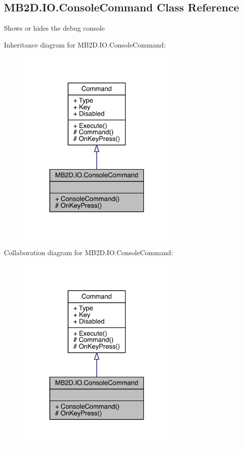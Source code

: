 \hypertarget{class_m_b2_d_1_1_i_o_1_1_console_command}{}\subsection{M\+B2\+D.\+I\+O.\+Console\+Command Class Reference}
\label{class_m_b2_d_1_1_i_o_1_1_console_command}


Shows or hides the debug console  




Inheritance diagram for M\+B2\+D.\+I\+O.\+Console\+Command\+:
\nopagebreak
\begin{figure}[H]
\begin{center}
\leavevmode
\includegraphics[width=223pt]{class_m_b2_d_1_1_i_o_1_1_console_command__inherit__graph}
\end{center}
\end{figure}


Collaboration diagram for M\+B2\+D.\+I\+O.\+Console\+Command\+:
\nopagebreak
\begin{figure}[H]
\begin{center}
\leavevmode
\includegraphics[width=223pt]{class_m_b2_d_1_1_i_o_1_1_console_command__coll__graph}
\end{center}
\end{figure}
